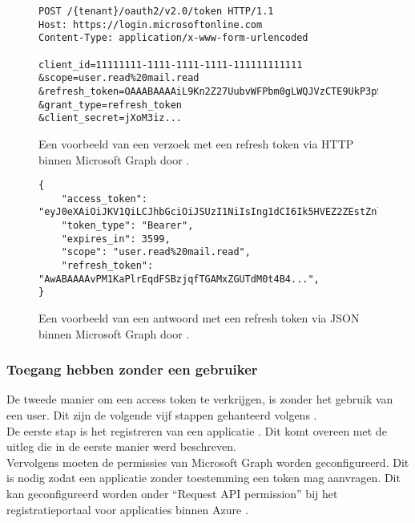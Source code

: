 \begin{figure}[h!]
    \scriptsize
    \begin{verbatim}
POST /{tenant}/oauth2/v2.0/token HTTP/1.1
Host: https://login.microsoftonline.com
Content-Type: application/x-www-form-urlencoded

client_id=11111111-1111-1111-1111-111111111111
&scope=user.read%20mail.read
&refresh_token=OAAABAAAAiL9Kn2Z27UubvWFPbm0gLWQJVzCTE9UkP3pSx1aXxUjq...
&grant_type=refresh_token
&client_secret=jXoM3iz...   
    \end{verbatim}  
    \caption[Voorbeeld Refresh Token request Microsoft Graph]{Een voorbeeld van een verzoek met een refresh token via \ac{HTTP} binnen Microsoft Graph door \textcite{Microsoft2023r}.}
    \label{MSGRTR}
\end{figure}

\begin{figure}[h!]
    \scriptsize
    \begin{verbatim}
{
    "access_token": "eyJ0eXAiOiJKV1QiLCJhbGciOiJSUzI1NiIsIng1dCI6Ik5HVEZ2ZEstZnl0aEV1Q...",
    "token_type": "Bearer",
    "expires_in": 3599,
    "scope": "user.read%20mail.read",
    "refresh_token": "AwABAAAAvPM1KaPlrEqdFSBzjqfTGAMxZGUTdM0t4B4...",
}    
    \end{verbatim}    
    \caption[Voorbeeld Refresh Token response Microsoft Graph]{Een voorbeeld van een antwoord met een refresh token via \ac{JSON} binnen Microsoft Graph door \textcite{Microsoft2023r}.}
    \label{MSGRTRES}
\end{figure}



\subsubsection{Toegang hebben zonder een gebruiker}

De tweede manier om een access token te verkrijgen, is zonder het gebruik van een user. Dit zijn de volgende vijf stappen gehanteerd volgens \textcite{Microsoft2023s}. \\

De eerste stap is het registreren van een applicatie \autocite{Microsoft2023s}. Dit komt overeen met de uitleg die in de eerste manier werd beschreven. \\

Vervolgens moeten de permissies van Microsoft Graph worden geconfigureerd. Dit is nodig zodat een applicatie zonder toestemming een token mag aanvragen. Dit kan geconfigureerd worden onder “Request \ac{API} permission” bij het registratieportaal voor applicaties binnen Azure \autocite{Microsoft2023s}. \\

